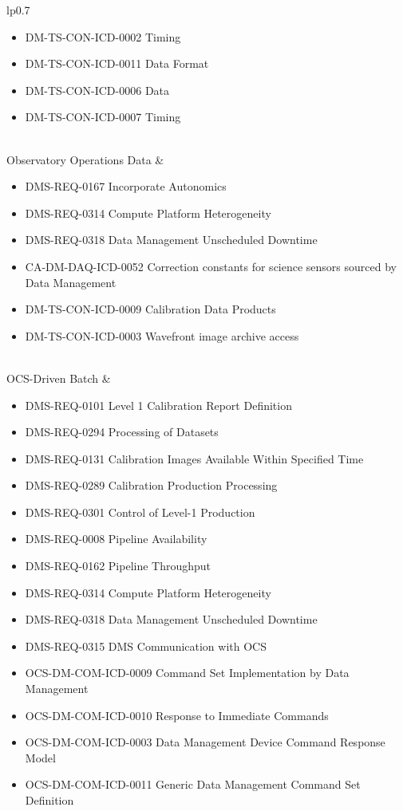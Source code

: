 \begin{xtabular}{lp{0.7\textwidth}}
\begin{itemize}
\item DM-TS-CON-ICD-0002 Timing
\item DM-TS-CON-ICD-0011 Data Format
\item DM-TS-CON-ICD-0006 Data
\item DM-TS-CON-ICD-0007 Timing
\end{itemize} \\ \hline
Observatory Operations Data &
\begin{itemize}DMS-REQ-0346 Data Availability
\item DMS-REQ-0167 Incorporate Autonomics
\item DMS-REQ-0314 Compute Platform Heterogeneity
\item DMS-REQ-0318 Data Management Unscheduled Downtime
\item CA-DM-DAQ-ICD-0052 Correction constants for science sensors sourced by Data Management
\item DM-TS-CON-ICD-0009 Calibration Data Products
\item DM-TS-CON-ICD-0003 Wavefront image archive access
\end{itemize} \\ \hline
OCS-Driven Batch &
\begin{itemize}DMS-REQ-0265 Guider Calibration Data Acquisition
\item DMS-REQ-0101 Level 1 Calibration Report Definition
\item DMS-REQ-0294 Processing of Datasets
\item DMS-REQ-0131 Calibration Images Available Within Specified Time
\item DMS-REQ-0289 Calibration Production Processing
\item DMS-REQ-0301 Control of Level-1 Production
\item DMS-REQ-0008 Pipeline Availability
\item DMS-REQ-0162 Pipeline Throughput
\item DMS-REQ-0314 Compute Platform Heterogeneity
\item DMS-REQ-0318 Data Management Unscheduled Downtime
\item DMS-REQ-0315 DMS Communication with OCS
\item OCS-DM-COM-ICD-0009 Command Set Implementation by Data Management
\item OCS-DM-COM-ICD-0010 Response to Immediate Commands
\item OCS-DM-COM-ICD-0003 Data Management Device Command Response Model
\item OCS-DM-COM-ICD-0011 Generic Data Management Command Set Definition

\end{itemize}
\end{xtabular}
